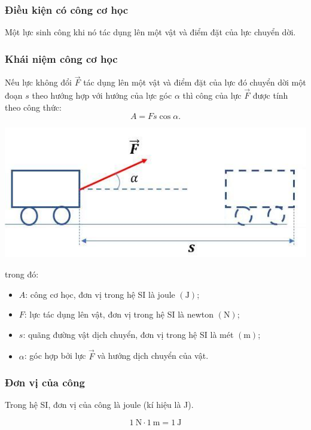 	\subsubsection{Điều kiện có công cơ học}
	Một lực sinh công khi nó tác dụng lên một vật và điểm đặt của lực chuyển dời.

	\subsubsection{Khái niệm công cơ học}
	Nếu lực không đổi $\vec{F}$ tác dụng lên một vật và điểm đặt của lực đó chuyển dời một đoạn $s$ theo hướng hợp với hướng của lực góc $\alpha$ thì công của lực $\vec{F}$ được tính theo công thức:
	\begin{equation*}
		A=Fs\cos \alpha.
	\end{equation*}
	\begin{center}
		\includegraphics[scale=0.6]{../figs/VN10-PH-30-L-022-1-3.jpg}
	\end{center}
	trong đó:
	\begin{itemize}
		\item $A$: công cơ học, đơn vị trong hệ SI là joule $\left(\si{\joule}\right)$;
		\item $F$: lực tác dụng lên vật, đơn vị trong hệ SI là newton $\left(\si{\newton}\right)$;
		\item $s$: quãng đường vật dịch chuyển, đơn vị trong hệ SI là mét $\left(\si{\meter}\right)$;
		\item $\alpha$: góc hợp bởi lực $\vec{F}$ và hướng dịch chuyển của vật.
	\end{itemize}
	\subsubsection{Đơn vị của công}
	Trong hệ SI, đơn vị của công là joule (kí hiệu là J).
	
	$$1\ \text{N} \cdot 1\ \text{m}= 1\ \text{J}$$
	
